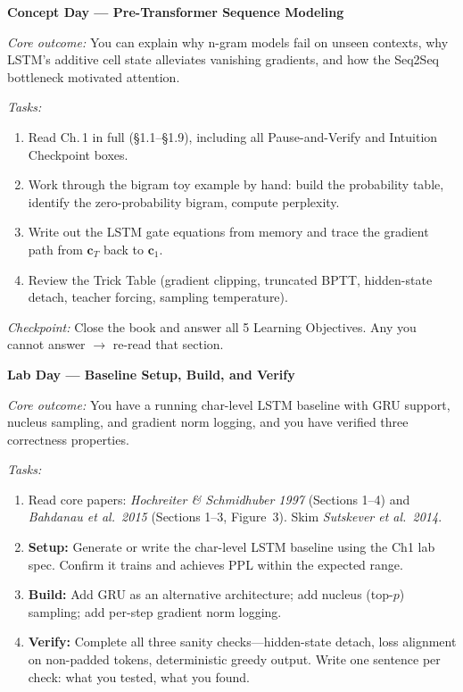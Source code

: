 \begin{description}[style=nextline, leftmargin=1.8cm, labelwidth=1.5cm]


\item[Day 1] \textbf{Concept Day --- Pre-Transformer Sequence Modeling}

\textit{Core outcome:} You can explain why n-gram models fail on unseen contexts, why LSTM's additive cell state alleviates vanishing gradients, and how the Seq2Seq bottleneck motivated attention.

\textit{Tasks:}
\begin{enumerate}
    \item Read Ch.\,1 in full (\S1.1--\S1.9), including all Pause-and-Verify and Intuition Checkpoint boxes.
    \item Work through the bigram toy example by hand: build the probability table, identify the zero-probability bigram, compute perplexity.
    \item Write out the LSTM gate equations from memory and trace the gradient path from $\mathbf{c}_T$ back to $\mathbf{c}_1$.
    \item Review the Trick Table (gradient clipping, truncated BPTT, hidden-state detach, teacher forcing, sampling temperature).
\end{enumerate}

\textit{Checkpoint:} Close the book and answer all 5 Learning Objectives. Any you cannot answer $\rightarrow$ re-read that section.

\item[Day 2] \textbf{Lab Day --- Baseline Setup, Build, and Verify}

\textit{Core outcome:} You have a running char-level LSTM baseline with GRU support, nucleus sampling, and gradient norm logging, and you have verified three correctness properties.

\textit{Tasks:}
\begin{enumerate}
    \item Read core papers: \emph{Hochreiter \& Schmidhuber 1997} (Sections 1--4) and \emph{Bahdanau et al.\ 2015} (Sections 1--3, Figure~3). Skim \emph{Sutskever et al.\ 2014}.
    \item \textbf{Setup:} Generate or write the char-level LSTM baseline using the Ch1 lab spec. Confirm it trains and achieves PPL within the expected range.
    \item \textbf{Build:} Add GRU as an alternative architecture; add nucleus (top-$p$) sampling; add per-step gradient norm logging.
    \item \textbf{Verify:} Complete all three sanity checks---hidden-state detach, loss alignment on non-padded tokens, deterministic greedy output. Write one sentence per check: what you tested, what you found.
\end{enumerate}


\end{description}
